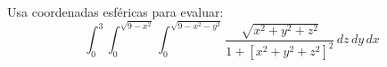 Usa coordenadas esféricas para evaluar:
\[\int_0^3 \int_0^{\sqrt{9 - x^2}} \int_0^{\sqrt{9 - x^2 - y^2}} \frac{\sqrt{x^2 + y^2 + z^2}}{1 + [x^2 + y^2 + z^2]^2}\, dz\, dy\, dx\]